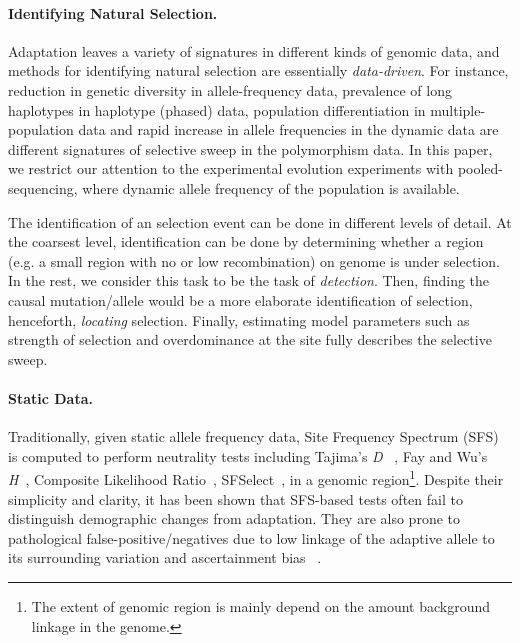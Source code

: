 \documentclass[11pt]{article}
\begin{document}
\paragraph{Identifying Natural Selection.} Adaptation leaves a variety of 
signatures 
in different kinds of genomic data, and methods for identifying natural 
selection are essentially \emph{data-driven}. For instance, reduction in 
genetic 
diversity\cite{tajima1989statistical,fay2000hitchhiking,ronen2013learning} in 
allele-frequency data, 
prevalence of long haplotypes 
	\cite{sabeti2006positive,vitti2013detecting} in haplotype (phased) data, 
	population differentiation \cite{holsinger2009genetics,burke2010genome} in 
	multiple-population	data and rapid increase in allele 
	frequencies \cite{bergland2014genomic} in the dynamic data are different 
	signatures of selective sweep in the polymorphism data.
In this paper, we restrict our attention to the experimental evolution 
experiments with pooled-sequencing, where dynamic allele frequency 
of the population is available. 

The identification of an selection event can be done in 
different levels of detail. At the coarsest level, identification can be done 
by 
determining whether a region 
(e.g. a small region with no or low recombination) on genome is 
under selection. 
In the rest, 
we consider this task to 
be the task of \emph{detection}.
Then, finding the causal 
mutation/allele would be a more elaborate identification of selection, 
henceforth, \emph{locating} selection. 
Finally, estimating model parameters such as strength of selection and 
overdominance at the site fully describes the selective sweep.

\paragraph{Static Data.} Traditionally, given static allele frequency data, 
Site Frequency Spectrum 
(SFS) is computed to perform neutrality tests including Tajima's \emph{D} 
~\cite{tajima1989statistical}, 
Fay and Wu's \emph{H}~\cite{fay2000hitchhiking}, 
Composite Likelihood Ratio~\cite{nielsen2005genomic}, 
SFSelect~\cite{ronen2013learning}, in a genomic 
region\footnote{The extent of genomic region is mainly depend on the  amount 
background linkage in the genome.}. Despite their simplicity and clarity, 
it has been shown that
  SFS-based tests often fail to distinguish demographic changes from 
  adaptation. They 
  are also prone to pathological false-positive/negatives
  due to low linkage of the adaptive allele to its surrounding variation and 
  ascertainment bias ~\cite{ptak2002evidence, 
  ramos2002statistical,akey2009constructing, 
  nielsen2003correcting,messer2013population}. 
\end{document}
